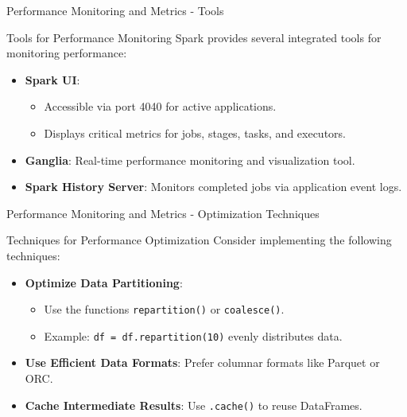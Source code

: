 \documentclass[aspectratio=169]{beamer}
\begin{document}
\begin{frame}[fragile]{Performance Monitoring and Metrics - Tools}
    \begin{block}{Tools for Performance Monitoring}
        Spark provides several integrated tools for monitoring performance:
        \begin{itemize}
            \item \textbf{Spark UI}:
            \begin{itemize}
                \item Accessible via port 4040 for active applications.
                \item Displays critical metrics for jobs, stages, tasks, and executors.
            \end{itemize}
            \item \textbf{Ganglia}: Real-time performance monitoring and visualization tool.
            \item \textbf{Spark History Server}: Monitors completed jobs via application event logs.
        \end{itemize}
    \end{block}
\end{frame}

\begin{frame}[fragile]{Performance Monitoring and Metrics - Optimization Techniques}
    \begin{block}{Techniques for Performance Optimization}
        Consider implementing the following techniques:
        \begin{itemize}
            \item \textbf{Optimize Data Partitioning}:
            \begin{itemize}
                \item Use the functions \texttt{repartition()} or \texttt{coalesce()}.
                \item Example: \texttt{df = df.repartition(10)} evenly distributes data.
            \end{itemize}
            \item \textbf{Use Efficient Data Formats}: Prefer columnar formats like Parquet or ORC.
            \item \textbf{Cache Intermediate Results}: Use \texttt{.cache()} to reuse DataFrames.
        \end{itemize}
    \end{block}
\end{frame}
\end{document}
